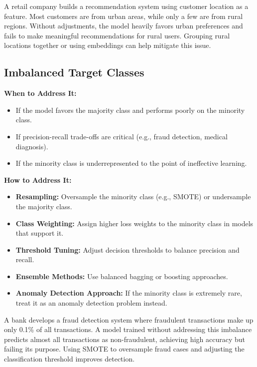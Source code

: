 \documentclass[12pt,openany]{book}
\begin{document}
\begin{examplebox}
A retail company builds a recommendation system using customer location as a feature. Most customers are from urban areas, while only a few are from rural regions. Without adjustments, the model heavily favors urban preferences and fails to make meaningful recommendations for rural users. Grouping rural locations together or using embeddings can help mitigate this issue.
\end{examplebox}

\subsection{Imbalanced Target Classes}

\textbf{When to Address It:}
\begin{itemize}
    \item If the model favors the majority class and performs poorly on the minority class.
    \item If precision-recall trade-offs are critical (e.g., fraud detection, medical diagnosis).
    \item If the minority class is underrepresented to the point of ineffective learning.
\end{itemize}

\textbf{How to Address It:}
\begin{itemize}
    \item \textbf{Resampling:} Oversample the minority class (e.g., SMOTE) or undersample the majority class.
    \item \textbf{Class Weighting:} Assign higher loss weights to the minority class in models that support it.
    \item \textbf{Threshold Tuning:} Adjust decision thresholds to balance precision and recall.
    \item \textbf{Ensemble Methods:} Use balanced bagging or boosting approaches.
    \item \textbf{Anomaly Detection Approach:} If the minority class is extremely rare, treat it as an anomaly detection problem instead.
\end{itemize}

\begin{examplebox}
A bank develops a fraud detection system where fraudulent transactions make up only 0.1\% of all transactions. A model trained without addressing this imbalance predicts almost all transactions as non-fraudulent, achieving high accuracy but failing its purpose. Using SMOTE to oversample fraud cases and adjusting the classification threshold improves detection.
\end{examplebox}
\end{document}
